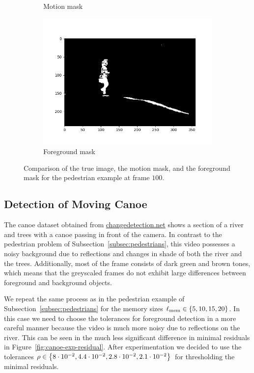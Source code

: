 \begin{figure}[!ht]
\begin{subfigure}{.3\textwidth}
        \caption{Motion mask}
    \end{subfigure}
    \hfill
    \begin{subfigure}{.3\textwidth}
        \includegraphics[width=\textwidth]{pedestrian_fg_frame_100.png}
        \caption{Foreground mask}
    \end{subfigure}
    \caption{Comparison of the true image, the motion mask, and the foreground mask for the pedestrian example at frame $100$.}\label{fig:pedestrian-frame-100}
\end{figure}

\subsection{Detection of Moving Canoe}\label{subsec:canoe} %

The canoe dataset obtained from \href{changedetection.net}{changedetection.net} shows a section of a river and trees with a canoe passing in front of the camera. In contrast to the pedestrian problem of Subsection~\ref{subsec:pedestrians}, this video possesses a noisy background due to reflections and changes in shade of both the river and the trees. Additionally, most of the frame consists of dark green and brown tones, which means that the greyscaled frames do not exhibit large differences between foreground and background objects.

We repeat the same process as in the pedestrian example of Subsection~\ref{subsec:pedestrians} for the memory sizes $\ell_\text{mem} \in \left\{5, 10, 15, 20\right\}$. In this case we need to choose the tolerances for foreground detection in a more careful manner because the video is much more noisy due to reflections on the river. This can be seen in the much less significant difference in minimal residuals in Figure~\ref{fig:canoe-exp-residual}. After experimentation we decided to use the tolerances $\rho \in \left\{8 \cdot 10^{-2}, 4.4 \cdot 10^{-2}, 2.8 \cdot 10^{-2}, 2.1 \cdot 10^{-2}\right\}$ for thresholding the minimal residuals.

